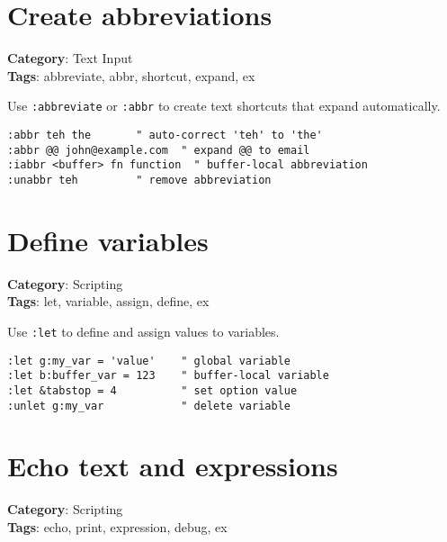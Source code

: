 {{{{{{\section{Create abbreviations}

\textbf{Category}: Text Input\\ \textbf{Tags}: abbreviate, abbr, shortcut, expand, ex
\vspace{0.5cm}

Use {\footnotesize \Verb§:abbreviate§} or {\footnotesize \Verb§:abbr§} to create text shortcuts that expand automatically.

\begin{Exa*}{}
\begin{Verbatim}[fontsize=\footnotesize, breaklines, breakanywhere]
:abbr teh the       " auto-correct 'teh' to 'the'
:abbr @@ john@example.com  " expand @@ to email
:iabbr <buffer> fn function  " buffer-local abbreviation
:unabbr teh         " remove abbreviation
\end{Verbatim}
\end{Exa*}

\section{Define variables}

\textbf{Category}: Scripting\\ \textbf{Tags}: let, variable, assign, define, ex
\vspace{0.5cm}

Use {\footnotesize \Verb§:let§} to define and assign values to variables.

\begin{Exa*}{}
\begin{Verbatim}[fontsize=\footnotesize, breaklines, breakanywhere]
:let g:my_var = 'value'    " global variable
:let b:buffer_var = 123    " buffer-local variable
:let &tabstop = 4          " set option value
:unlet g:my_var            " delete variable
\end{Verbatim}
\end{Exa*}

\section{Echo text and expressions}

\textbf{Category}: Scripting\\ \textbf{Tags}: echo, print, expression, debug, ex
\vspace{0.5cm}

}}}}}}
